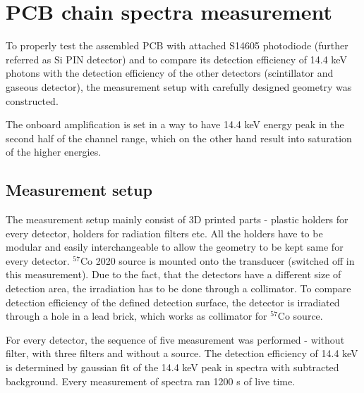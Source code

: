 \chapter{PCB chain spectra measurement} 

To properly test the assembled PCB with attached S14605 photodiode (further referred as Si PIN detector) and to compare its detection efficiency of 14.4 keV photons with the detection efficiency of the other detectors (scintillator and gaseous detector), the measurement setup with carefully designed geometry was constructed.

%

\par

The onboard amplification is set in a way to have 14.4 keV energy peak in the second half of the channel range, which on the other hand result into saturation of the higher energies. 



\section{Measurement setup}
The measurement setup mainly consist of 3D printed parts - plastic holders for every detector, holders for radiation filters etc. All the holders have to be modular and easily interchangeable to allow the geometry to be kept same for every detector.
$^{57}$Co 2020 source is mounted onto the transducer (switched off in this measurement). Due to the fact, that the detectors have a different size of detection area, the irradiation has to be done through a collimator. To compare detection efficiency of the defined detection surface, the detector is irradiated through a hole in a lead brick, which works as collimator for $^{57}$Co source.

\par
For every detector, the sequence of five measurement was performed - without filter, with three filters and without a source. The detection efficiency of 14.4 keV is determined by gaussian fit of the 14.4 keV peak in spectra with subtracted background. Every measurement of spectra ran 1200 s of live time.


